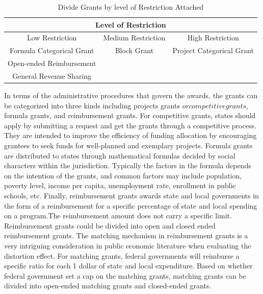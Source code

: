 \begin{table}[H]
    \centering
    \caption{Divide Grants by level of Restriction Attached}
    \begin{tabular}{ccc}
        \toprule
        \multicolumn{3}{c}{Level of Restriction}                                   \\
        \midrule
        Low Restriction           & Medium Restriction & High Restriction          \\
        \midrule
        Formula Categorical Grant & Block Grant        & Project Categorical Grant \\
        Open-ended Reimbursement  &                    &                           \\
        General Revenue Sharing   &                    &                           \\
        \bottomrule
    \end{tabular}%
    \label{Table 1.3}%
\end{table}%


In terms of the administrative procedures that govern the awards, the grants can be categorized into three kinds including projects grants \(or competitive grants\), formula grants, and reimbursement grants. For competitive grants, states should apply by submitting a request and get the grants through a competitive process. They are intended to improve the efficiency of funding allocation by encouraging grantees to seek funds for well-planned and exemplary projects. Formula grants are distributed to states through mathematical formulas decided by social characters within the jurisdiction. Typically the factors in the formula depends on the intention of the grants, and common factors may include population, poverty level, income per capita, unemployment rate, enrollment in public schools, etc. Finally, reimbursement grants awards state and local governments in the form of a reimbursement for a specific percentage of state and local spending on a program.The reimbursement amount does not carry a specific limit. Reimbursement grants could be divided into open and closed ended reimbursement grants. The matching mechanism in reimbursement grants is a very intriguing consideration in public economic literature when evaluating the distortion effect. For matching grants, federal governments will reimburse a specific ratio for each 1 dollar of state and local expenditure. Based on whether federal government set a cap on the matching grants, matching grants can be divided into open-ended matching grants and closed-ended grants.

